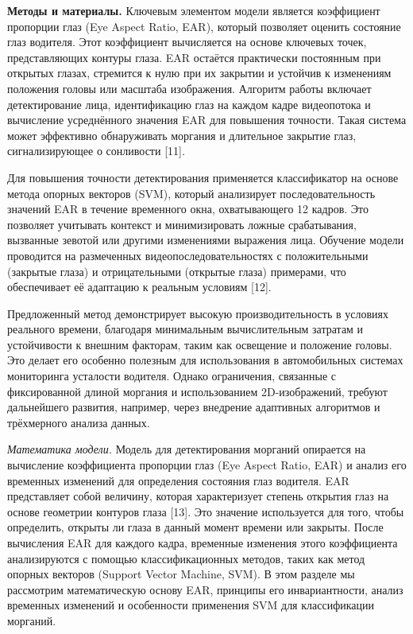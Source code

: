 \begin{multicols}{2}
{\bfseries Методы и материалы.} Ключевым элементом модели является
коэффициент пропорции глаз (Eye Aspect Ratio, EAR), который позволяет
оценить состояние глаз водителя. Этот коэффициент вычисляется на основе
ключевых точек, представляющих контуры глаза. EAR остаётся практически
постоянным при открытых глазах, стремится к нулю при их закрытии и
устойчив к изменениям положения головы или масштаба изображения.
Алгоритм работы включает детектирование лица, идентификацию глаз на
каждом кадре видеопотока и вычисление усреднённого значения EAR для
повышения точности. Такая система может эффективно обнаруживать моргания
и длительное закрытие глаз, сигнализирующее о сонливости {[}11{]}.

Для повышения точности детектирования применяется классификатор на
основе метода опорных векторов (SVM), который анализирует
последовательность значений EAR в течение временного окна, охватывающего
12 кадров. Это позволяет учитывать контекст и минимизировать ложные
срабатывания, вызванные зевотой или другими изменениями выражения лица.
Обучение модели проводится на размеченных видеопоследовательностях с
положительными (закрытые глаза) и отрицательными (открытые глаза)
примерами, что обеспечивает её адаптацию к реальным условиям {[}12{]}.

Предложенный метод демонстрирует высокую производительность в условиях
реального времени, благодаря минимальным вычислительным затратам и
устойчивости к внешним факторам, таким как освещение и положение головы.
Это делает его особенно полезным для использования в автомобильных
системах мониторинга усталости водителя. Однако ограничения, связанные с
фиксированной длиной моргания и использованием 2D-изображений, требуют
дальнейшего развития, например, через внедрение адаптивных алгоритмов и
трёхмерного анализа данных.

\emph{Математика модели.} Модель для детектирования морганий опирается
на вычисление коэффициента пропорции глаз (Eye Aspect Ratio, EAR) и
анализ его временных изменений для определения состояния глаз водителя.
EAR представляет собой величину, которая характеризует степень открытия
глаз на основе геометрии контуров глаза {[}13{]}. Это значение
используется для того, чтобы определить, открыты ли глаза в данный
момент времени или закрыты. После вычисления EAR для каждого кадра,
временные изменения этого коэффициента анализируются с помощью
классификационных методов, таких как метод опорных векторов (Support
Vector Machine, SVM). В этом разделе мы рассмотрим математическую основу
EAR, принципы его инвариантности, анализ временных изменений и
особенности применения SVM для классификации морганий.


\end{multicols}
